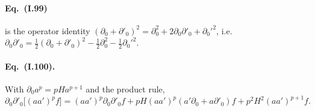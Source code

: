 \paragraph{Eq.~(I.99)} is the operator identity $(\partial_0+\partial'_0)^2=\partial_0^2+2\partial_0\partial'_0+\partial_0'^2$, i.e.
$\partial_0\partial'_0=\frac12(\partial_0+\partial'_0)^2-\frac12\partial_0^2-\frac12\partial_0'^2$.

\paragraph{Eq.~(I.100).} With $\partial_0a^p=pHa^{p+1}$ and the product rule,
\begin{equation}
\partial_0\partial'_0\big[(aa')^pf\big]=(aa')^p\partial_0\partial'_0f+pH(aa')^p(a'\partial_0+a\partial'_0)f+p^2H^2(aa')^{p+1}f .\tag{I.100}
\end{equation}


